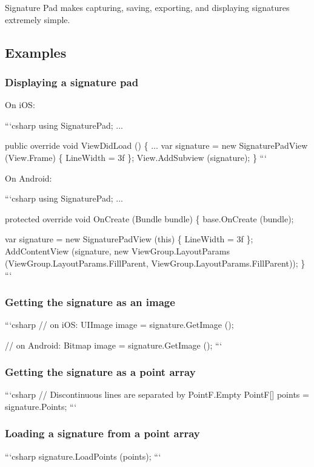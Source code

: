 Signature Pad makes capturing, saving, exporting, and displaying signatures extremely simple.

\subsection*{Examples}

\subsubsection*{Displaying a signature pad}

On i\+O\+S\+:

```csharp using Signature\+Pad; ...

public override void View\+Did\+Load () \{ ... var signature = new Signature\+Pad\+View (View.\+Frame) \{ Line\+Width = 3f \}; View.\+Add\+Subview (signature); \} ```

On Android\+:

```csharp using Signature\+Pad; ...

protected override void On\+Create (Bundle bundle) \{ base.\+On\+Create (bundle);

var signature = new Signature\+Pad\+View (this) \{ Line\+Width = 3f \}; Add\+Content\+View (signature, new View\+Group.\+Layout\+Params (View\+Group.\+Layout\+Params.\+Fill\+Parent, View\+Group.\+Layout\+Params.\+Fill\+Parent)); \} ```

\subsubsection*{Getting the signature as an image}

```csharp // on i\+O\+S\+: U\+I\+Image image = signature.\+Get\+Image ();

// on Android\+: Bitmap image = signature.\+Get\+Image (); ```

\subsubsection*{Getting the signature as a point array}

```csharp // Discontinuous lines are separated by Point\+F.\+Empty Point\+F\mbox{[}\mbox{]} points = signature.\+Points; ```

\subsubsection*{Loading a signature from a point array}

```csharp signature.\+Load\+Points (points); ``` 
